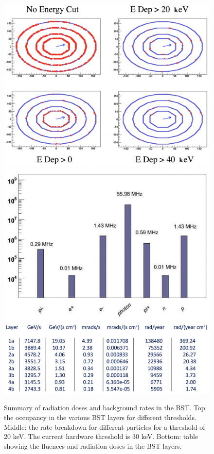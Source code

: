 \begin{figure}
	\centering
	\includegraphics[width=0.95\columnwidth,keepaspectratio]{img/bstHitDisplay.png}
	\includegraphics[width=0.95\columnwidth,keepaspectratio]{img/bstRates.png}
	\includegraphics[width=0.95\columnwidth,keepaspectratio]{img/bstRadSummary.png}
	\caption{Summary of radiation doses and background rates in the BST. Top: the occupancy in the various BST layers
            for different thresholds. Middle: the rate breakdown for different particles for a threshold of 20 keV.
            The current hardware threshold is 30 keV. Bottom: table showing the fluences and radiation doses in the BST
            layers. }
	\label{fig:radStudy}
\end{figure}




